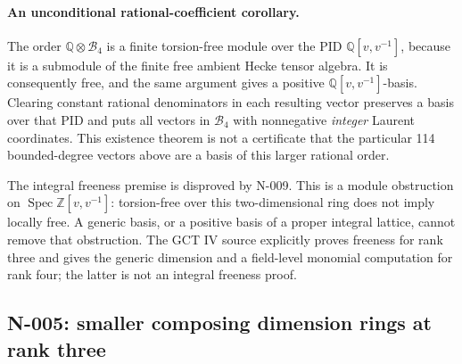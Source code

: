 \paragraph{An unconditional rational-coefficient corollary.}
The order $\mathbb Q\otimes\mathcal B_4$ is a finite torsion-free module
over the PID $\mathbb Q[v,v^{-1}]$, because it is a submodule of the
finite free ambient Hecke tensor algebra.  It is consequently free,
and the same argument gives a positive
$\mathbb Q[v,v^{-1}]$-basis.  Clearing constant rational denominators
in each resulting vector preserves a basis over that PID and puts all
vectors in $\mathcal B_4$ with nonnegative \emph{integer} Laurent
coordinates.  This existence theorem is not a certificate that the
particular 114 bounded-degree vectors above are a basis of this larger
rational order.

The integral freeness premise is disproved by N-009. This is a module obstruction on $\operatorname{Spec}\mathbb Z[v,v^{-1}]$: torsion-free over this two-dimensional ring does not imply locally free.  A generic basis, or a positive basis of a proper integral lattice, cannot remove that obstruction.
The GCT IV source explicitly proves freeness for rank three and gives
the generic dimension and a field-level monomial computation for rank
four; the latter is not an integral freeness proof.

\subsection{N-005: smaller composing dimension rings at rank three}

